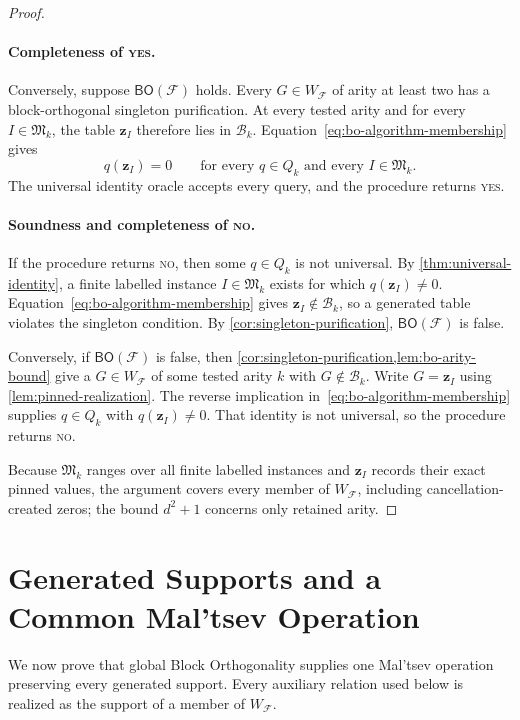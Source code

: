 \documentclass[11pt]{article}
\theoremstyle{plain}
\theoremstyle{definition}
\theoremstyle{remark}
\newcommand{\cF}{\mathcal F}
\newcommand{\BO}{\mathsf{BO}}
\newcommand{\zvec}[1]{\mathbf z_{#1}}
\newcommand{\InstMonoid}[1]{\mathfrak M_{#1}}
\newcommand{\YES}{\textnormal{\textsc{yes}}}
\newcommand{\NO}{\textnormal{\textsc{no}}}
\begin{document}
\begin{proof}
\paragraph{Completeness of \YES.}
Conversely, suppose $\BO(\cF)$ holds.  Every $G\in W_{\cF}$ of arity at
least two has a block-orthogonal singleton purification.  At every tested
arity and for every $I\in\InstMonoid{k}$, the table $\zvec I$ therefore lies
in $\mathcal B_k$.  Equation~\eqref{eq:bo-algorithm-membership} gives
\[
  q(\zvec I)=0
  \qquad
  \text{for every }q\in Q_k
  \text{ and every }I\in\InstMonoid{k}.
\]
The universal identity oracle accepts every query, and the procedure returns
\YES.

\paragraph{Soundness and completeness of \NO.}
If the procedure returns \NO, then some $q\in Q_k$ is not universal.
By \cref{thm:universal-identity}, a finite labelled instance
$I\in\InstMonoid{k}$ exists for which $q(\zvec I)\ne0$.
Equation~\eqref{eq:bo-algorithm-membership}
gives $\zvec I\notin\mathcal B_k$, so a generated table violates the
singleton condition.  By \cref{cor:singleton-purification}, $\BO(\cF)$ is
false.

Conversely, if $\BO(\cF)$ is false, then
\cref{cor:singleton-purification,lem:bo-arity-bound} give a
$G\in W_{\cF}$ of some tested arity $k$ with $G\notin\mathcal B_k$.  Write
$G=\zvec I$ using \cref{lem:pinned-realization}.  The reverse implication
in~\eqref{eq:bo-algorithm-membership} supplies $q\in Q_k$ with
$q(\zvec I)\ne0$.  That identity is not universal, so the procedure returns
\NO.

Because $\InstMonoid{k}$ ranges over all finite labelled instances and
$\zvec I$ records their exact pinned values, the argument covers every member
of $W_{\cF}$, including cancellation-created zeros; the bound $d^2+1$
concerns only retained arity.
\end{proof}

\section{Generated Supports and a Common Mal'tsev Operation}
\label{sec:generated-supports}

We now prove that global Block Orthogonality supplies one Mal'tsev operation
preserving every generated support.  Every auxiliary relation used below is
realized as the support of a member of $W_{\cF}$.
\end{document}
